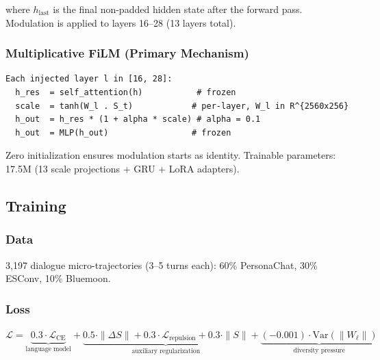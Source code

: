 \documentclass[11pt,a4paper]{article}
\newcommand{\R}{\mathbb{R}}
\newcommand{\St}{S_t}
\newcommand{\Stp}{S_{t+1}}
\begin{document}
where $h_{\mathrm{last}}$ is the final non-padded hidden state after the forward
pass. Modulation is applied to layers 16--28 (13 layers total).

\subsubsection*{Multiplicative FiLM (Primary Mechanism)}

\begin{lstlisting}
Each injected layer l in [16, 28]:
  h_res  = self_attention(h)           # frozen
  scale  = tanh(W_l . S_t)            # per-layer, W_l in R^{2560x256}
  h_out  = h_res * (1 + alpha * scale) # alpha = 0.1
  h_out  = MLP(h_out)                 # frozen
\end{lstlisting}

Zero initialization ensures modulation starts as identity. Trainable parameters:
17.5M (13 scale projections + GRU + LoRA adapters).

\subsection{Training}

\subsubsection*{Data}

3,197 dialogue micro-trajectories (3--5 turns each): 60\% PersonaChat, 30\% ESConv,
10\% Bluemoon.

\subsubsection*{Loss}

$\mathcal{L} = \underbrace{0.3\cdot\mathcal{L}_\mathrm{CE}}_\text{language model} + \underbrace{0.5\cdot\|\Delta S\| + 0.3\cdot\mathcal{L}_\mathrm{repulsion} + 0.3\cdot\|S\|}_\text{auxiliary regularization} + \underbrace{(-0.001)\cdot\mathrm{Var}(\|W_\ell\|)}_\text{diversity pressure}$
\end{document}
